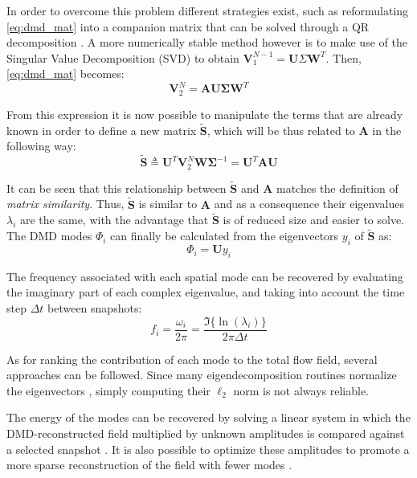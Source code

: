 In order to overcome this problem different strategies exist, such as reformulating \ref{eq:dmd_mat} into a companion matrix that can be solved through a QR decomposition \cite{schmid2011applications,rowley2009spectral,bagheri2013koopman}. A more numerically stable method however is to make use of the Singular Value Decomposition (SVD) \cite{schmid2010dynamic,jovanovic2014sparsity,sakowitz2014flow,chen2012variants} to obtain $\mathbf V_1^{N-1} = \mathbf U \Sigma\mathbf W^T$. Then, \ref{eq:dmd_mat} becomes:
\begin{equation}
	\mathbf V_2^N = \mathbf A \mathbf U \bm\Sigma \mathbf W^T
\end{equation}

From this expression it is now possible to manipulate the terms that are already known in order to define a new matrix $\widetilde{\mathbf{S}}$, which will be thus related to $\mathbf A$ in the following way:
\begin{equation}
	\widetilde{\mathbf{S}} \triangleq \mathbf U^T \mathbf V_2^N \mathbf W \bm\Sigma^{-1} = \mathbf U^T \mathbf A \mathbf U
\end{equation}

It can be seen that this relationship between $\widetilde{\mathbf{S}}$ and $\mathbf A$ matches the definition of \emph{matrix similarity}. Thus, $\widetilde{\mathbf{S}}$ is similar to $\mathbf A$ and as a consequence their eigenvalues $\lambda_i$ are the same, with the advantage that $\widetilde{\mathbf{S}}$ is of reduced size and easier to solve. The DMD modes $\Phi_i$ can finally be calculated from the eigenvectors $y_i$ of $\widetilde{\mathbf{S}}$ as:
\begin{equation}
	\Phi_i = \mathbf U y_i
\end{equation}

The frequency associated with each spatial mode can be recovered by evaluating the imaginary part of each complex eigenvalue, and taking into account the time step $\Delta t$ between snapshots:
\begin{equation}
	f_i = \frac{\omega_i}{2\pi} = \frac{\Im\{\ln(\lambda_i)\}}{2\pi\Delta t}
\end{equation}

As for ranking the contribution of each mode to the total flow field, several approaches can be followed. Since many eigendecomposition routines normalize the eigenvectors \cite{futrzynski2015dymode}, simply computing their $\ell_2$ norm is not always reliable. 

The energy of the modes can be recovered by solving a linear system in which the DMD-reconstructed field multiplied by unknown amplitudes is compared against a selected snapshot \cite{futrzynski2015dymode}. It is also possible to optimize these amplitudes to promote a more sparse reconstruction of the field with fewer modes \cite{jovanovic2014sparsity}. 

